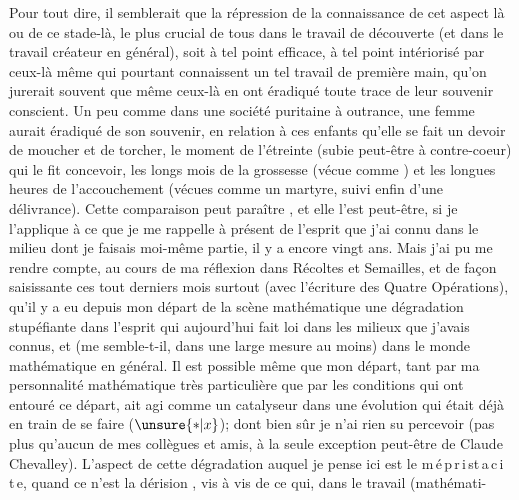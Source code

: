 Pour tout dire, il semblerait que la répression de la connaissance de cet aspect là
ou de ce stade-là, le plus crucial de tous\deleted{\unsure{,}} dans le travail de découverte
(et dans le travail créateur en général), soit à tel point efficace, à tel point intériorisé
par ceux-là même qui pourtant connaissent un tel travail de première main, qu'on jurerait souvent
que même ceux-là  en ont éradiqué toute trace de leur souvenir conscient.
Un peu comme dans une société puritaine à outrance, une femme aurait éradiqué de son souvenir,
 en relation à ces enfants qu'elle se fait un devoir de moucher
et de torcher, le moment de l'étreinte (subie peut-être à contre-coeur) qui le fit concevoir,
les longs mois de la grossesse\deleted{\unsure{,}} (vécue comme )
et les longues heures de l'accouchement (vécues comme un martyre,
suivi enfin d'une délivrance).
Cette comparaison peut paraître , et elle l'est peut-être,
si je l'applique à ce que je me rappelle à présent de l'esprit que j'ai connu dans le milieu
dont je faisais moi-même partie, il y a encore vingt ans.
Mais  j'ai pu me rendre compte, au cours de ma réflexion
dans Récoltes et Semailles, et de façon saisissante ces tout derniers mois surtout
(avec l'écriture des Quatre Opérations), qu'il y a eu depuis mon départ de la scène mathématique
une  dégradation stupéfiante dans l'esprit qui aujourd'hui fait loi dans les milieux
que j'avais connus, et (me semble-t-il, dans une large mesure au moins) dans le monde mathématique en général.
Il est possible même que mon départ, tant par ma personnalité mathématique très particulière
que par les conditions qui ont entouré ce départ, ait agi comme un catalyseur dans une évolution
qui était déjà en train de se faire ($\unsure{*|x}$); 
dont bien sûr je n'ai rien su percevoir (pas plus qu'aucun de mes collègues et amis,
à la seule exception peut-être de Claude Chevalley).
L'aspect de cette dégradation
auquel je pense ici est le 
m\,é\,p\,r\,i\,s\quad t\,a\,c\,i\,t\,e,
 quand ce n'est la dérision
, vis à vis de ce qui, dans le travail (mathémati-
